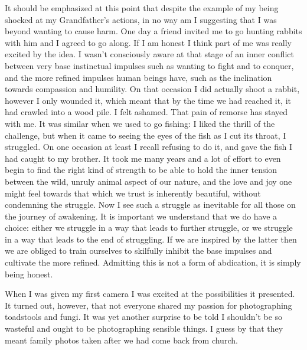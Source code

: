 It should be emphasized at this point that despite the example of my
being shocked at my Grandfather's actions, in no way am I suggesting
that I was beyond wanting to cause harm. One day a friend invited me to
go hunting rabbits with him and I agreed to go along. If I am honest I
think part of me was really excited by the idea. I wasn't consciously
aware at that stage of an inner conflict between very base instinctual
impulses such as wanting to fight and to conquer, and the more refined
impulses human beings have, such as the inclination towards compassion
and humility. On that occasion I did actually shoot a rabbit, however I
only wounded it, which meant that by the time we had reached it, it had
crawled into a wood pile. I felt ashamed. That pain of remorse has
stayed with me. It was similar when we used to go fishing: I liked the
thrill of the challenge, but when it came to seeing the eyes of the fish
as I cut its throat, I struggled. On one occasion at least I recall
refusing to do it, and gave the fish I had caught to my brother. It took
me many years and a lot of effort to even begin to find the right kind
of strength to be able to hold the inner tension between the wild,
unruly animal aspect of our nature, and the love and joy one might feel
towards that which we trust is inherently beautiful, without condemning
the struggle. Now I see such a struggle as inevitable for all those on
the journey of awakening. It is important we understand that we do have
a choice: either we struggle in a way that leads to further struggle, or
we struggle in a way that leads to the end of struggling. If we are
inspired by the latter then we are obliged to train ourselves to
skilfully inhibit the base impulses and cultivate the more refined.
Admitting this is not a form of abdication, it is simply being honest.

When I was given my first camera I was excited at the possibilities it
presented. It turned out, however, that not everyone shared my passion
for photographing toadstools and fungi. It was yet another surprise to
be told I shouldn't be so wasteful and ought to be photographing
sensible things. I guess by that they meant family photos taken after we
had come back from church.

